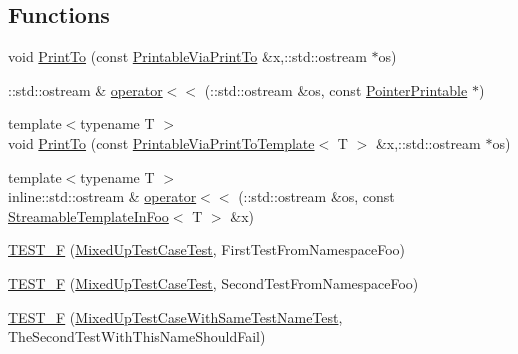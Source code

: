 \subsection*{Functions}
\begin{DoxyCompactItemize}
\item 
void \hyperlink{namespacefoo_a6808585dc0cb2884adeb4f39e3cb95cf}{Print\-To} (const \hyperlink{structfoo_1_1_printable_via_print_to}{Printable\-Via\-Print\-To} \&x,\-::std\-::ostream $\ast$os)
\item 
\-::std\-::ostream \& \hyperlink{namespacefoo_a65f8809f6af7f69f5cc842493caf4491}{operator$<$$<$} (\-::std\-::ostream \&os, const \hyperlink{structfoo_1_1_pointer_printable}{Pointer\-Printable} $\ast$)
\item 
{\footnotesize template$<$typename T $>$ }\\void \hyperlink{namespacefoo_a27945da9cb5c9d3d51b69e6429c2f46d}{Print\-To} (const \hyperlink{classfoo_1_1_printable_via_print_to_template}{Printable\-Via\-Print\-To\-Template}$<$ T $>$ \&x,\-::std\-::ostream $\ast$os)
\item 
{\footnotesize template$<$typename T $>$ }\\inline\-::std\-::ostream \& \hyperlink{namespacefoo_abe04f604d114085b0b9af25600ef00da}{operator$<$$<$} (\-::std\-::ostream \&os, const \hyperlink{classfoo_1_1_streamable_template_in_foo}{Streamable\-Template\-In\-Foo}$<$ T $>$ \&x)
\item 
\hyperlink{namespacefoo_a0d50eecc97df56ae625078848ba9c98a}{T\-E\-S\-T\-\_\-\-F} (\hyperlink{classfoo_1_1_mixed_up_test_case_test}{Mixed\-Up\-Test\-Case\-Test}, First\-Test\-From\-Namespace\-Foo)
\item 
\hyperlink{namespacefoo_a7911fd62b6ae405016caed779b2f95dc}{T\-E\-S\-T\-\_\-\-F} (\hyperlink{classfoo_1_1_mixed_up_test_case_test}{Mixed\-Up\-Test\-Case\-Test}, Second\-Test\-From\-Namespace\-Foo)
\item 
\hyperlink{namespacefoo_a2bc2a2547ff38da0ecf68676e75583cd}{T\-E\-S\-T\-\_\-\-F} (\hyperlink{classfoo_1_1_mixed_up_test_case_with_same_test_name_test}{Mixed\-Up\-Test\-Case\-With\-Same\-Test\-Name\-Test}, The\-Second\-Test\-With\-This\-Name\-Should\-Fail)
\end{DoxyCompactItemize}



